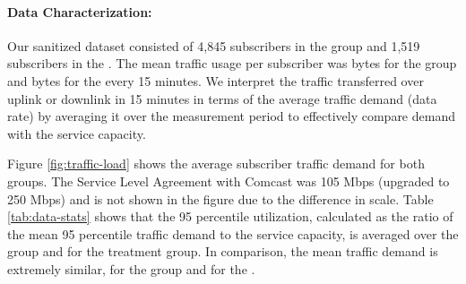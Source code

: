 

\paragraph{Data Characterization: }Our sanitized dataset consisted of 4,845 
subscribers in the \control{} group and 1,519 subscribers in the \treatment{}. 
The mean traffic usage per subscriber was  bytes for the \control{} 
group and  bytes for the \treatment{} every 15 minutes. We interpret 
the traffic transferred over uplink or downlink in 15 minutes in terms of the 
average traffic demand (data rate) by averaging it over the measurement period 
to effectively compare demand with the service capacity.

Figure \ref{fig:traffic-load} shows the average subscriber traffic demand 
for both groups. The Service Level Agreement with Comcast was 105 
Mbps (upgraded to 250 Mbps) and is not shown in the figure due to the 
difference in scale. Table \ref{tab:data-stats} shows that the 95 percentile 
utilization, calculated as the ratio of the mean 95 
percentile traffic demand to the service capacity, is  averaged 
over the \control{} group and  for the treatment group. In 
comparison, the mean traffic demand is extremely similar,  for the 
\control{} group and  for the \treatment{}.